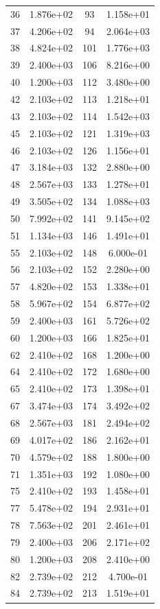 \documentclass[12pt]{article}
\begin{document}
\begin{longtable}{@{}cccc@{}}
36 & 1.876e+02 & 93 & 1.158e+01 \\
37 & 4.206e+02 & 94 & 2.064e+03 \\
38 & 4.824e+02 & 101 & 1.776e+03 \\
39 & 2.400e+03 & 106 & 8.216e+00 \\
40 & 1.200e+03 & 112 & 3.480e+00 \\
42 & 2.103e+02 & 113 & 1.218e+01 \\
43 & 2.103e+02 & 114 & 1.542e+03 \\
45 & 2.103e+02 & 121 & 1.319e+03 \\
46 & 2.103e+02 & 126 & 1.156e+01 \\
47 & 3.184e+03 & 132 & 2.880e+00 \\
48 & 2.567e+03 & 133 & 1.278e+01 \\
49 & 3.505e+02 & 134 & 1.088e+03 \\
50 & 7.992e+02 & 141 & 9.145e+02 \\
51 & 1.134e+03 & 146 & 1.491e+01 \\
55 & 2.103e+02 & 148 & 6.000e-01 \\
56 & 2.103e+02 & 152 & 2.280e+00 \\
57 & 4.820e+02 & 153 & 1.338e+01 \\
58 & 5.967e+02 & 154 & 6.877e+02 \\
59 & 2.400e+03 & 161 & 5.726e+02 \\
60 & 1.200e+03 & 166 & 1.825e+01 \\
62 & 2.410e+02 & 168 & 1.200e+00 \\
64 & 2.410e+02 & 172 & 1.680e+00 \\
65 & 2.410e+02 & 173 & 1.398e+01 \\
67 & 3.474e+03 & 174 & 3.492e+02 \\
68 & 2.567e+03 & 181 & 2.494e+02 \\
69 & 4.017e+02 & 186 & 2.162e+01 \\
70 & 4.579e+02 & 188 & 1.800e+00 \\
71 & 1.351e+03 & 192 & 1.080e+00 \\
75 & 2.410e+02 & 193 & 1.458e+01 \\
77 & 5.478e+02 & 194 & 2.931e+01 \\
78 & 7.563e+02 & 201 & 2.461e+01 \\
79 & 2.400e+03 & 206 & 2.171e+02 \\
80 & 1.200e+03 & 208 & 2.410e+00 \\
82 & 2.739e+02 & 212 & 4.700e-01 \\
84 & 2.739e+02 & 213 & 1.519e+01 \\

\end{longtable}
\end{document}
